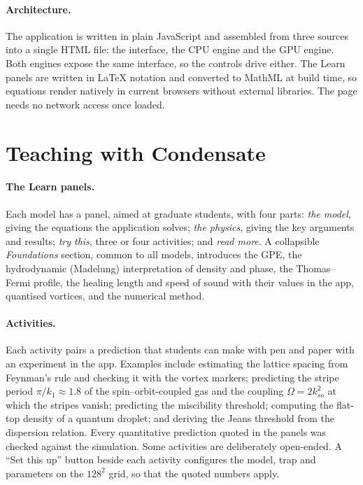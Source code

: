 \documentclass[11pt,a4paper]{article}
\begin{document}
\paragraph{Architecture.} The application is written in plain JavaScript and assembled from three sources into a single HTML file: the interface, the CPU engine and the GPU engine. Both engines expose the same interface, so the controls drive either. The Learn panels are written in \LaTeX{} notation and converted to MathML at build time, so equations render natively in current browsers without external libraries. The page needs no network access once loaded.


\section{Teaching with Condensate}
\label{sec:teaching}

\paragraph{The Learn panels.} Each model has a panel, aimed at graduate students, with four parts: \emph{the model}, giving the equations the application solves; \emph{the physics}, giving the key arguments and results; \emph{try this}, three or four activities; and \emph{read more}. A collapsible \emph{Foundations} section, common to all models, introduces the GPE, the hydrodynamic (Madelung) interpretation of density and phase, the Thomas--Fermi profile, the healing length and speed of sound with their values in the app, quantised vortices, and the numerical method.

\paragraph{Activities.} Each activity pairs a prediction that students can make with pen and paper with an experiment in the app. Examples include estimating the lattice spacing from Feynman's rule and checking it with the vortex markers; predicting the stripe period $\pi/k_1\approx1.8$ of the spin--orbit-coupled gas and the coupling $\Omega=2k_{so}^2$ at which the stripes vanish; predicting the miscibility threshold; computing the flat-top density of a quantum droplet; and deriving the Jeans threshold from the dispersion relation. Every quantitative prediction quoted in the panels was checked against the simulation. Some activities are deliberately open-ended. A ``Set this up'' button beside each activity configures the model, trap and parameters on the $128^2$ grid, so that the quoted numbers apply.
\end{document}
